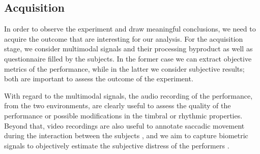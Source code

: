 \subsection{Acquisition}
In order to observe the experiment and draw meaningful conclusions, we need to acquire the outcome that are interesting for our analysis. For the acquisition stage, we consider multimodal signals and their processing byproduct as well as questionnaire filled by the subjects. In the former case we can extract objective metrics of the performance, while in the latter we consider subjective results; both are important to assess the outcome of the experiment. 

With regard to the multimodal signals, the audio recording of the performance, from the two environments, are clearly useful to assess the quality of the performance or possible modifications in the timbral or rhythmic properties. Beyond that, video recordings are also useful to annotate saccadic movement during the interaction between the subjects \cite{vandemoortele2018gazing}, and we aim to capture biometric signals to objectively estimate the subjective distress of the performers \cite{Yoshie2009}. 
